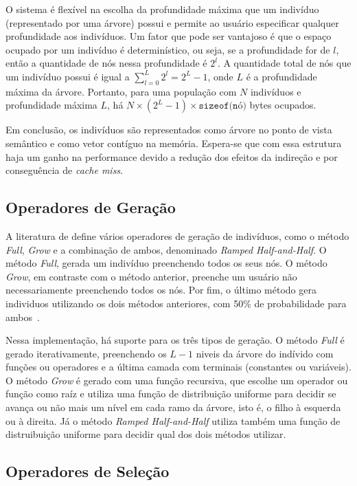 \documentclass[a4paper]{article}
\begin{document}
O sistema é flexível na escolha da profundidade máxima que um indivíduo
(representado por uma árvore) possui e permite ao usuário especificar qualquer
profundidade aos indivíduos.  Um fator que pode ser vantajoso é que o espaço
ocupado por um indivíduo é determinístico, ou seja, se a profundidade for de
$l$, então a quantidade de nós nessa profundidade é $2^l$.  A quantidade total
de nós que um indivíduo possui é igual a $\sum_{l=0}^{L}2^l=2^{L}-1$, onde $L$ é
a profundidade máxima da árvore. Portanto, para uma população com $N$ indivíduos
e profundidade máxima $L$, há $N\times(2^{L}-1)\times\texttt{sizeof(nó)}$ bytes
ocupados.

Em conclusão, os indivíduos são representados como árvore no ponto de vista
semântico e como vetor contíguo na memória.  Espera-se que com essa estrutura
haja um ganho na performance devido a redução dos efeitos da indireção e por
conseguência de \textit{cache miss}.

\subsection{Operadores de Geração} \label{subsec:generation}

A literatura de define vários operadores de geração de indivíduos, como o método
\textit{Full}, \textit{Grow} e a combinação de ambos, denominado \textit{Ramped
  Half-and-Half}. O método \textit{Full}, gerada um indivíduo preenchendo todos
os seus nós. O método \textit{Grow}, em contraste com o método anterior,
preenche um usuário não necessariamente preenchendo todos os nós. Por fim, o
último método gera individuos utilizando os dois métodos anteriores, com 50\% de
probabilidade para ambos~\citep{poli2008}.

Nessa implementação, há suporte para os três tipos de geração. O método
\textit{Full} é gerado iterativamente, preenchendo os $L-1$ niveis da árvore do
indívido com funções ou operadores e a última camada com terminais (constantes
ou variáveis).  O método \textit{Grow} é gerado com uma função recursiva, que
escolhe um operador ou função como raíz e utiliza uma função de distribuição
uniforme para decidir se avança ou não mais um nível em cada ramo da árvore,
isto é, o filho à esquerda ou à direita. Já o método \textit{Ramped
  Half-and-Half} utiliza também uma função de distruibuição uniforme para
decidir qual dos dois métodos utilizar.

\subsection{Operadores de Seleção} \label{subsec:selection}
\end{document}
